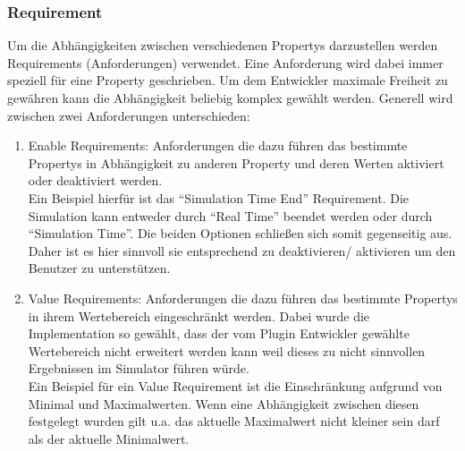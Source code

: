 \documentclass[a4paper, 11pt]{article} %
\begin{document}
\subsubsection{Requirement} %
\label{ssub:requirement}
Um die Abhängigkeiten zwischen verschiedenen Propertys darzustellen werden Requirements (Anforderungen) verwendet. Eine Anforderung wird dabei immer speziell für eine Property geschrieben. Um dem Entwickler maximale Freiheit zu gewähren kann die Abhängigkeit beliebig komplex gewählt werden.
Generell wird zwischen zwei Anforderungen unterschieden:
\begin{enumerate}
	\item Enable Requirements: Anforderungen die dazu führen das bestimmte Propertys in Abhängigkeit zu anderen Property und deren Werten aktiviert oder deaktiviert werden.
	\\Ein Beispiel hierfür ist das "`Simulation Time End"' Requirement. Die Simulation kann entweder durch "`Real Time"' beendet werden oder durch "`Simulation Time"'. Die beiden Optionen schließen sich somit gegenseitig aus. Daher ist es hier sinnvoll sie entsprechend zu deaktivieren/ aktivieren um den Benutzer zu unterstützen.
	\item Value Requirements: Anforderungen die dazu führen das bestimmte Propertys in ihrem Wertebereich eingeschränkt werden. Dabei wurde die Implementation so gewählt, dass der vom Plugin Entwickler gewählte Wertebereich nicht erweitert werden kann weil dieses zu nicht sinnvollen Ergebnissen im Simulator führen würde.
	\\ Ein Beispiel für ein Value Requirement ist die Einschränkung aufgrund von Minimal und Maximalwerten. Wenn eine Abhängigkeit zwischen diesen festgelegt wurden gilt u.a. das aktuelle Maximalwert nicht kleiner sein darf als der aktuelle Minimalwert.
\end{enumerate}
\end{document}
